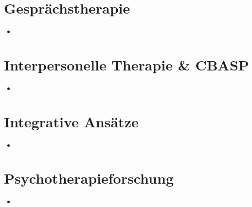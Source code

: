 \documentclass[11pt, paper=a4, twocolumn]{scrartcl}
\begin{document}
	\section{Gesprächstherapie}
		\begin{itemize}
			\item 
		\end{itemize}

	\section{Interpersonelle Therapie \& CBASP}
		\begin{itemize}
			\item 
		\end{itemize}

	\section{Integrative Ansätze}
		\begin{itemize}
			\item 
		\end{itemize}

	\section{Psychotherapieforschung}
		\begin{itemize}
			\item 
		\end{itemize}
\end{document}
